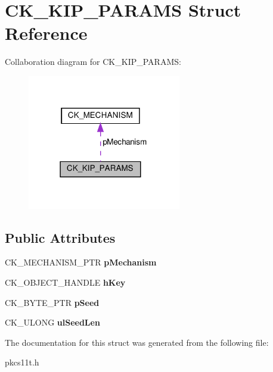 \hypertarget{struct_c_k___k_i_p___p_a_r_a_m_s}{}\section{C\+K\+\_\+\+K\+I\+P\+\_\+\+P\+A\+R\+A\+MS Struct Reference}
\label{struct_c_k___k_i_p___p_a_r_a_m_s}


Collaboration diagram for C\+K\+\_\+\+K\+I\+P\+\_\+\+P\+A\+R\+A\+MS\+:
\nopagebreak
\begin{figure}[H]
\begin{center}
\leavevmode
\includegraphics[width=190pt]{struct_c_k___k_i_p___p_a_r_a_m_s__coll__graph}
\end{center}
\end{figure}
\subsection*{Public Attributes}
\begin{DoxyCompactItemize}
\item 
\mbox{\label{struct_c_k___k_i_p___p_a_r_a_m_s_ae2c9f533b73768561ea4fb994342dbf7}} 
C\+K\+\_\+\+M\+E\+C\+H\+A\+N\+I\+S\+M\+\_\+\+P\+TR {\bfseries p\+Mechanism}
\item 
\mbox{\label{struct_c_k___k_i_p___p_a_r_a_m_s_a80217053023d8fcb269e81cf349d6f2f}} 
C\+K\+\_\+\+O\+B\+J\+E\+C\+T\+\_\+\+H\+A\+N\+D\+LE {\bfseries h\+Key}
\item 
\mbox{\label{struct_c_k___k_i_p___p_a_r_a_m_s_aa02cbf703bf4b440204b219576d6872b}} 
C\+K\+\_\+\+B\+Y\+T\+E\+\_\+\+P\+TR {\bfseries p\+Seed}
\item 
\mbox{\label{struct_c_k___k_i_p___p_a_r_a_m_s_a6edf93be690ec6b728ffb62de917a5d0}} 
C\+K\+\_\+\+U\+L\+O\+NG {\bfseries ul\+Seed\+Len}
\end{DoxyCompactItemize}


The documentation for this struct was generated from the following file\+:\begin{DoxyCompactItemize}
\item 
pkcs11t.\+h\end{DoxyCompactItemize}

